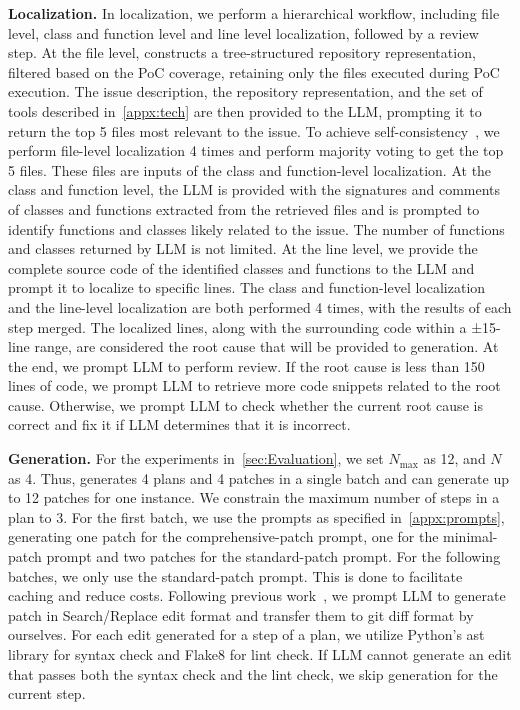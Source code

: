 \noindent\textbf{Localization.}
In localization, we perform a hierarchical workflow, including file level, class and function level and line level localization, followed by a review step.
At the file level, \sys constructs a tree-structured repository representation, filtered based on the PoC coverage, retaining only the files executed during PoC execution. 
The issue description, the repository representation, and the set of tools described in~\cref{appx:tech} are then provided to the LLM, prompting it to return the top 5 files most relevant to the issue. 
To achieve self-consistency~\cite{ahmed2023better}, we perform file-level localization 4 times and perform majority voting to get the top 5 files. These files are inputs of the class and function-level localization.
At the class and function level, the LLM is provided with the signatures and comments of classes and functions extracted from the retrieved files and is prompted to identify functions and classes likely related to the issue. The number of functions and classes returned by LLM is not limited. 
At the line level, we provide the complete source code of the identified classes and functions to the LLM and prompt it to localize to specific lines. 
The class and function-level localization and the line-level localization are both performed 4 times, with the results of each step merged.
The localized lines, along with the surrounding code within a ±15-line range, are considered the root cause that will be provided to generation.
At the end, we prompt LLM to perform review. If the root cause is less than 150 lines of code, we prompt LLM to retrieve more code snippets related to the root cause. Otherwise, we prompt LLM to check whether the current root cause is correct and fix it if LLM determines that it is incorrect.

\noindent\textbf{Generation.}
For the experiments in~\cref{sec:Evaluation}, we set $N_{\text{max}}$ as 12, and $N$ as 4. 
Thus, \sys generates 4 plans and 4 patches in a single batch and can generate up to 12 patches for one instance.
We constrain the maximum number of steps in a plan to 3.
For the first batch, we use the prompts as specified in~\cref{appx:prompts}, generating one patch for the comprehensive-patch prompt, one for the minimal-patch prompt and two patches for the standard-patch prompt.
For the following batches, we only use the standard-patch prompt. This is done to facilitate caching and reduce costs. 
Following previous work~\cite{Aider}, we prompt LLM to generate patch in Search/Replace edit format and transfer them to git diff format by ourselves. For each edit generated for a step of a plan, we utilize Python's ast library for syntax check and Flake8 for lint check. If LLM cannot generate an edit that passes both the syntax check and the lint check, we skip generation for the current step.

